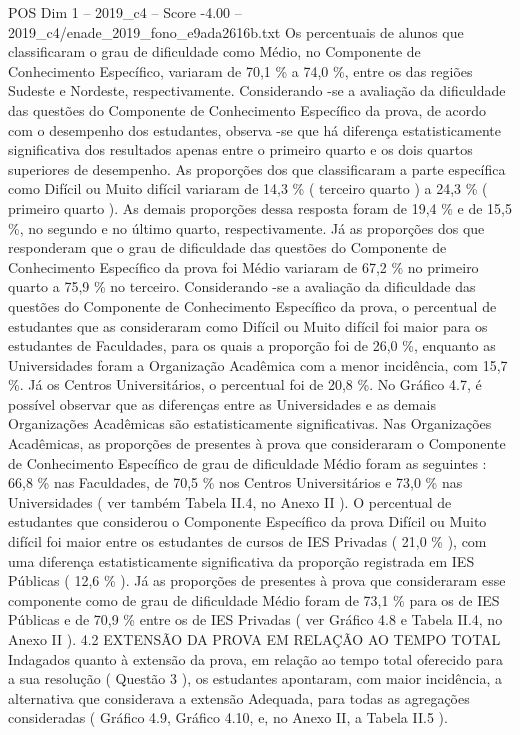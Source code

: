 \begin{textsample}{POS Dim 1 – 2019\_c4 – Score -4.00 – 2019\_c4/enade\_2019\_fono\_e9ada2616b.txt}
Os percentuais de alunos que classificaram o grau de dificuldade como Médio, no Componente de Conhecimento Específico, variaram de 70,1 \% a 74,0 \%, entre os das regiões Sudeste e Nordeste, respectivamente.
Considerando -se a avaliação da dificuldade das questões do Componente de Conhecimento Específico da prova, de acordo com o desempenho dos estudantes, observa -se que há diferença estatisticamente significativa dos resultados apenas entre o primeiro quarto e os dois quartos superiores de desempenho.
As proporções dos que classificaram a parte específica como Difícil ou Muito difícil variaram de 14,3 \% ( terceiro quarto ) a 24,3 \% ( primeiro quarto ).
As demais proporções dessa resposta foram de 19,4 \% e de 15,5 \%, no segundo e no último quarto, respectivamente.
Já as proporções dos que responderam que o grau de dificuldade das questões do Componente de Conhecimento Específico da prova foi Médio variaram de 67,2 \% no primeiro quarto a 75,9 \% no terceiro.
Considerando -se a avaliação da dificuldade das questões do Componente de Conhecimento Específico da prova, o percentual de estudantes que as consideraram como Difícil ou Muito difícil foi maior para os estudantes de Faculdades, para os quais a proporção foi de 26,0 \%, enquanto as Universidades foram a Organização Acadêmica com a menor incidência, com 15,7 \%.
Já os Centros Universitários, o percentual foi de 20,8 \%.
No Gráfico 4.7, é possível observar que as diferenças entre as Universidades e as demais Organizações Acadêmicas são estatisticamente significativas.
Nas Organizações Acadêmicas, as proporções de presentes à prova que consideraram o Componente de Conhecimento Específico de grau de dificuldade Médio foram as seguintes : 66,8 \% nas Faculdades, de 70,5 \% nos Centros Universitários e 73,0 \% nas Universidades ( ver também Tabela II.4, no Anexo II ).
O percentual de estudantes que considerou o Componente Específico da prova Difícil ou Muito difícil foi maior entre os estudantes de cursos de IES Privadas ( 21,0 \% ), com uma diferença estatisticamente significativa da proporção registrada em IES Públicas ( 12,6 \% ).
Já as proporções de presentes à prova que consideraram esse componente como de grau de dificuldade Médio foram de 73,1 \% para os de IES Públicas e de 70,9 \% entre os de IES Privadas ( ver Gráfico 4.8 e Tabela II.4, no Anexo II ). 4.2 EXTENSÃO DA PROVA EM RELAÇÃO AO TEMPO TOTAL Indagados quanto à extensão da prova, em relação ao tempo total oferecido para a sua resolução ( Questão 3 ), os estudantes apontaram, com maior incidência, a alternativa que considerava a extensão Adequada, para todas as agregações consideradas ( Gráfico 4.9, Gráfico 4.10, e, no Anexo II, a Tabela II.5 ).

\end{textsample}
